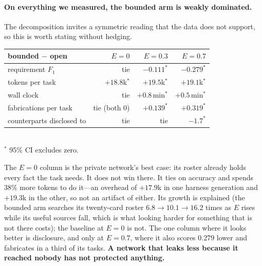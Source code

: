 \paragraph{On everything we measured, the bounded arm is weakly dominated.} The
decomposition invites a symmetric reading that the data does not support, so this is worth
stating without hedging.

\begin{center}\small
\begin{tabular}{@{}lrrr@{}}
\toprule
\textbf{bounded $-$ open} & \textbf{$E=0$} & \textbf{$E=0.3$} & \textbf{$E=0.7$} \\
\midrule
requirement $F_1$         & tie              & $-0.111^\ast$      & $-0.279^\ast$ \\
tokens per task           & $+18.8$k$^\ast$  & $+19.5$k$^\ast$    & $+19.1$k$^\ast$ \\
wall clock                & tie              & $+0.8$\,min$^\ast$ & $+0.5$\,min$^\ast$ \\
fabrications per task     & tie (both $0$)   & $+0.139^\ast$      & $+0.319^\ast$ \\
counterparts disclosed to & tie              & tie                & $-1.7^\ast$ \\
\bottomrule
\end{tabular}\\[1pt]
{\footnotesize $^\ast$ 95\% CI excludes zero.}
\end{center}

\noindent The $E=0$ column is the private network's best case: its roster already holds
every fact the task needs. It does not win there. It ties on accuracy and spends 38\% more
tokens to do it---an overhead of $+17.9$k in one harness generation and $+19.3$k in the
other, so not an artifact of either. Its growth is explained (the bounded arm searches its
twenty-card roster $6.8 \to 10.1 \to 16.2$ times as $E$ rises while its useful sources fall,
which is what looking harder for something that is not there costs); the baseline at $E=0$
is not. The one column where it looks better is disclosure, and only at $E=0.7$, where it
also scores $0.279$ lower and fabricates in a third of its tasks. \textbf{A network that
leaks less because it reached nobody has not protected anything.}

